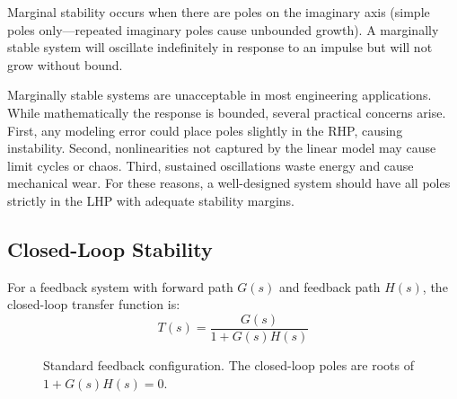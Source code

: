 Marginal stability occurs when there are poles on the imaginary axis (simple poles only---repeated imaginary poles cause unbounded growth). A marginally stable system will oscillate indefinitely in response to an impulse but will not grow without bound.

\begin{warningbox}
Marginally stable systems are unacceptable in most engineering applications. While mathematically the response is bounded, several practical concerns arise. First, any modeling error could place poles slightly in the RHP, causing instability. Second, nonlinearities not captured by the linear model may cause limit cycles or chaos. Third, sustained oscillations waste energy and cause mechanical wear. For these reasons, a well-designed system should have all poles strictly in the LHP with adequate stability margins.
\end{warningbox}

\subsection{Closed-Loop Stability}

For a feedback system with forward path $G(s)$ and feedback path $H(s)$, the closed-loop transfer function is:
\begin{equation}
T(s) = \frac{G(s)}{1 + G(s)H(s)}
\label{eq:closed_loop}
\end{equation}

\begin{figure}[H]
\centering
{}
\caption{Standard feedback configuration. The closed-loop poles are roots of $1 + G(s)H(s) = 0$.}
\label{fig:feedback_block}
\end{figure}

